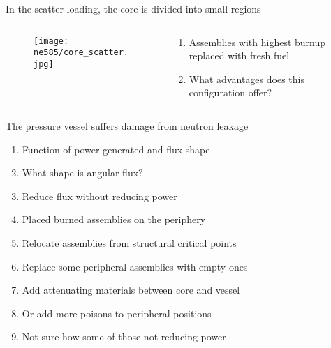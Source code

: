\documentclass[aspectratio=1610,pdftex,dvipsnames,compress,xcolor={dvipsnames}]{beamer}
\begin{document}
\begin{frame}{In the scatter loading, the core is divided into small regions}
    \begin{columns}

        \begin{column}{0.55\textwidth}
            \begin{figure}
                \centering
                \texttt{[image: ne585/core\_scatter.jpg]}
            \end{figure}
        \end{column}

        \begin{column}{0.45\textwidth}
            \begin{enumerate}[series=outerlist,topsep=0pt,itemsep=15pt,leftmargin=*,label=(\arabic*)]
                \item[]Assemblies with highest burnup replaced with fresh fuel
                \item[]What advantages does this configuration offer?
            \end{enumerate}
        \end{column}

    \end{columns}
\end{frame}


\begin{frame}{The pressure vessel suffers damage from neutron leakage}
    \begin{enumerate}[series=outerlist,topsep=0pt,itemsep=7pt,leftmargin=*,label=(\arabic*)]
        \item[]Function of power generated and flux shape
        \item[]What shape is angular flux? 
        \item[]Reduce flux without reducing power
        \item[]Placed burned assemblies on the periphery
        \item[]Relocate assemblies from structural critical points
        \item[]Replace some peripheral assemblies with empty ones
        \item[]Add attenuating materials between core and vessel
        \item[]Or add more poisons to peripheral positions
        \item[]Not sure how some of those not reducing power
    \end{enumerate}
\end{frame}
\end{document}
